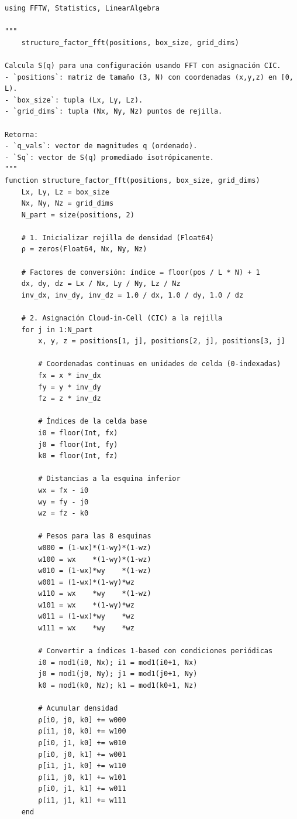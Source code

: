 \documentclass[justified, notoc]{tufte-handout}
\begin{document}
\begin{verbatim}
using FFTW, Statistics, LinearAlgebra

"""
    structure_factor_fft(positions, box_size, grid_dims)

Calcula S(q) para una configuración usando FFT con asignación CIC.
- `positions`: matriz de tamaño (3, N) con coordenadas (x,y,z) en [0, L).
- `box_size`: tupla (Lx, Ly, Lz).
- `grid_dims`: tupla (Nx, Ny, Nz) puntos de rejilla.

Retorna:
- `q_vals`: vector de magnitudes q (ordenado).
- `Sq`: vector de S(q) promediado isotrópicamente.
"""
function structure_factor_fft(positions, box_size, grid_dims)
    Lx, Ly, Lz = box_size
    Nx, Ny, Nz = grid_dims
    N_part = size(positions, 2)
    
    # 1. Inicializar rejilla de densidad (Float64)
    ρ = zeros(Float64, Nx, Ny, Nz)
    
    # Factores de conversión: índice = floor(pos / L * N) + 1
    dx, dy, dz = Lx / Nx, Ly / Ny, Lz / Nz
    inv_dx, inv_dy, inv_dz = 1.0 / dx, 1.0 / dy, 1.0 / dz
    
    # 2. Asignación Cloud-in-Cell (CIC) a la rejilla
    for j in 1:N_part
        x, y, z = positions[1, j], positions[2, j], positions[3, j]
        
        # Coordenadas continuas en unidades de celda (0-indexadas)
        fx = x * inv_dx
        fy = y * inv_dy
        fz = z * inv_dz
        
        # Índices de la celda base
        i0 = floor(Int, fx)
        j0 = floor(Int, fy)
        k0 = floor(Int, fz)
        
        # Distancias a la esquina inferior
        wx = fx - i0
        wy = fy - j0
        wz = fz - k0
        
        # Pesos para las 8 esquinas
        w000 = (1-wx)*(1-wy)*(1-wz)
        w100 = wx    *(1-wy)*(1-wz)
        w010 = (1-wx)*wy    *(1-wz)
        w001 = (1-wx)*(1-wy)*wz
        w110 = wx    *wy    *(1-wz)
        w101 = wx    *(1-wy)*wz
        w011 = (1-wx)*wy    *wz
        w111 = wx    *wy    *wz
        
        # Convertir a índices 1-based con condiciones periódicas
        i0 = mod1(i0, Nx); i1 = mod1(i0+1, Nx)
        j0 = mod1(j0, Ny); j1 = mod1(j0+1, Ny)
        k0 = mod1(k0, Nz); k1 = mod1(k0+1, Nz)
        
        # Acumular densidad
        ρ[i0, j0, k0] += w000
        ρ[i1, j0, k0] += w100
        ρ[i0, j1, k0] += w010
        ρ[i0, j0, k1] += w001
        ρ[i1, j1, k0] += w110
        ρ[i1, j0, k1] += w101
        ρ[i0, j1, k1] += w011
        ρ[i1, j1, k1] += w111
    end
    

\end{verbatim}
\end{document}
